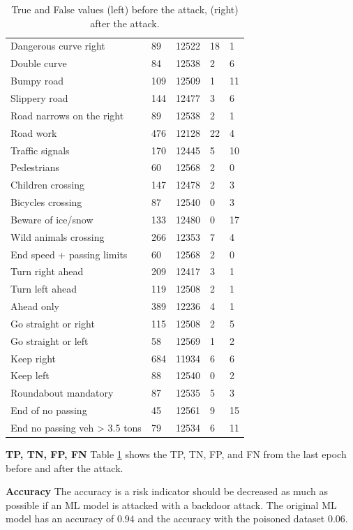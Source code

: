 \begin{table}[ht!]
\begin{tabular}{| l | p{1.5cm} | p{2cm} | p{1.5cm} | p{1.5cm} |}
  Dangerous curve right & 89 & 12522 & 18 & 1 \\
  Double curve & 84 & 12538 & 2 & 6 \\
  Bumpy road & 109 & 12509 & 1 & 11 \\
  Slippery road & 144 & 12477 & 3 & 6 \\
  Road narrows on the right & 89 & 12538 & 2 & 1 \\
  Road work & 476 & 12128 & 22 & 4 \\
  Traffic signals & 170 & 12445 & 5 & 10 \\
  Pedestrians & 60 & 12568 & 2 & 0 \\
  Children crossing & 147 & 12478 & 2 & 3 \\
  Bicycles crossing & 87 & 12540 & 0 & 3 \\
  Beware of ice/snow & 133 & 12480 & 0 & 17 \\
  Wild animals crossing & 266 & 12353 & 7 & 4 \\
  End speed + passing limits & 60 & 12568 & 2 & 0\\
  Turn right ahead & 209 & 12417 & 3 & 1 \\
  Turn left ahead & 119 & 12508 & 2 & 1 \\
  Ahead only & 389 & 12236 & 4 & 1 \\
  Go straight or right & 115 & 12508 & 2 & 5 \\
  Go straight or left & 58 & 12569 & 1 & 2 \\
  Keep right & 684 & 11934 & 6 & 6 \\
  Keep left & 88 & 12540 & 0 & 2 \\
  Roundabout mandatory & 87 & 12535 & 5 & 3 \\
  End of no passing & 45 & 12561 & 9 & 15 \\
  End no passing veh > 3.5 tons & 79 & 12534 & 6 & 11 \\
  \hline
  \end{tabular}
  \caption{True and False values (left) before the attack, (right) after the attack.}
  \label{tab:pos_neg}
\end{table}

\noindent\textbf{TP, TN, FP, FN} Table \ref{tab:pos_neg} shows the TP, TN, FP, and FN from the last epoch before and after the attack.

\noindent\textbf{Accuracy} The accuracy is a risk indicator should be decreased as much as possible if an ML model is attacked with a backdoor attack. The original ML model has an accuracy of $0.94$ and the accuracy with the poisoned dataset $0.06$. \\

